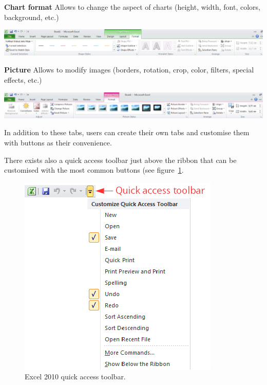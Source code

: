 \textbf{Chart format} Allows to change the aspect of charts (height, width, font, colors, background, etc.)

\begin{center}
\includegraphics[max width=\linewidth]{../img/excel_2010_format_chart_ribbon.png}
\end{center}

\textbf{Picture} Allows to modify images (borders, rotation, crop, color, filters, special effects, etc.)

\begin{center}
\includegraphics[max width=\linewidth]{../img/excel_2010_picture_ribbon.png}
\end{center}

In addition to these tabs, users can create their own tabs and customise them with buttons as their convenience.

There exists also a quick access toolbar just above the ribbon that can be customised with the most common buttons (see
figure~\ref{img-quick_access_toolbar}.

\begin{figure}[htbp]
\begin{center}
\includegraphics[max width=\linewidth]{../img/quick_access_toolbar.png}
\end{center}
\caption{Excel 2010 quick access toolbar.}
\label{img-quick_access_toolbar}
\end{figure}


